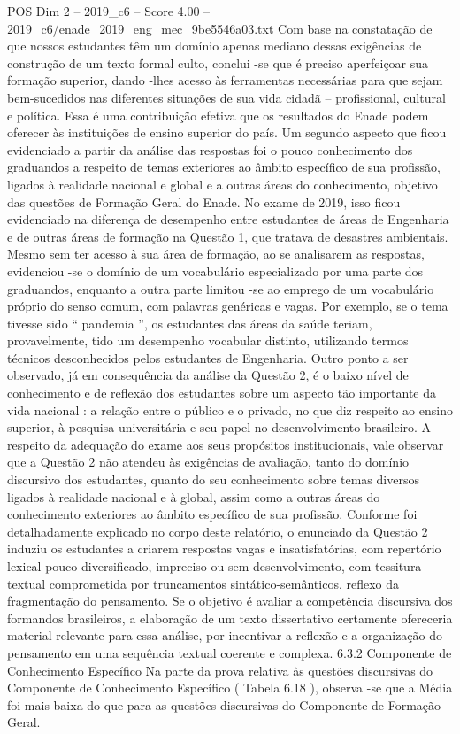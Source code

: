 \begin{textsample}{POS Dim 2 – 2019\_c6 – Score 4.00 – 2019\_c6/enade\_2019\_eng\_mec\_9be5546a03.txt}
Com base na constatação de que nossos estudantes têm um domínio apenas mediano dessas exigências de construção de um texto formal culto, conclui -se que é preciso aperfeiçoar sua formação superior, dando -lhes acesso às ferramentas necessárias para que sejam bem-sucedidos nas diferentes situações de sua vida cidadã – profissional, cultural e política.
Essa é uma contribuição efetiva que os resultados do Enade podem oferecer às instituições de ensino superior do país.
Um segundo aspecto que ficou evidenciado a partir da análise das respostas foi o pouco conhecimento dos graduandos a respeito de temas exteriores ao âmbito específico de sua profissão, ligados à realidade nacional e global e a outras áreas do conhecimento, objetivo das questões de Formação Geral do Enade.
No exame de 2019, isso ficou evidenciado na diferença de desempenho entre estudantes de áreas de Engenharia e de outras áreas de formação na Questão 1, que tratava de desastres ambientais.
Mesmo sem ter acesso à sua área de formação, ao se analisarem as respostas, evidenciou -se o domínio de um vocabulário especializado por uma parte dos graduandos, enquanto a outra parte limitou -se ao emprego de um vocabulário próprio do senso comum, com palavras genéricas e vagas.
Por exemplo, se o tema tivesse sido “ pandemia ”, os estudantes das áreas da saúde teriam, provavelmente, tido um desempenho vocabular distinto, utilizando termos técnicos desconhecidos pelos estudantes de Engenharia.
Outro ponto a ser observado, já em consequência da análise da Questão 2, é o baixo nível de conhecimento e de reflexão dos estudantes sobre um aspecto tão importante da vida nacional : a relação entre o público e o privado, no que diz respeito ao ensino superior, à pesquisa universitária e seu papel no desenvolvimento brasileiro.
A respeito da adequação do exame aos seus propósitos institucionais, vale observar que a Questão 2 não atendeu às exigências de avaliação, tanto do domínio discursivo dos estudantes, quanto do seu conhecimento sobre temas diversos ligados à realidade nacional e à global, assim como a outras áreas do conhecimento exteriores ao âmbito específico de sua profissão.
Conforme foi detalhadamente explicado no corpo deste relatório, o enunciado da Questão 2 induziu os estudantes a criarem respostas vagas e insatisfatórias, com repertório lexical pouco diversificado, impreciso ou sem desenvolvimento, com tessitura textual comprometida por truncamentos sintático-semânticos, reflexo da fragmentação do pensamento.
Se o objetivo é avaliar a competência discursiva dos formandos brasileiros, a elaboração de um texto dissertativo certamente ofereceria material relevante para essa análise, por incentivar a reflexão e a organização do pensamento em uma sequência textual coerente e complexa. 6.3.2 Componente de Conhecimento Específico Na parte da prova relativa às questões discursivas do Componente de Conhecimento Específico ( Tabela 6.18 ), observa -se que a Média foi mais baixa do que para as questões discursivas do Componente de Formação Geral.

\end{textsample}
